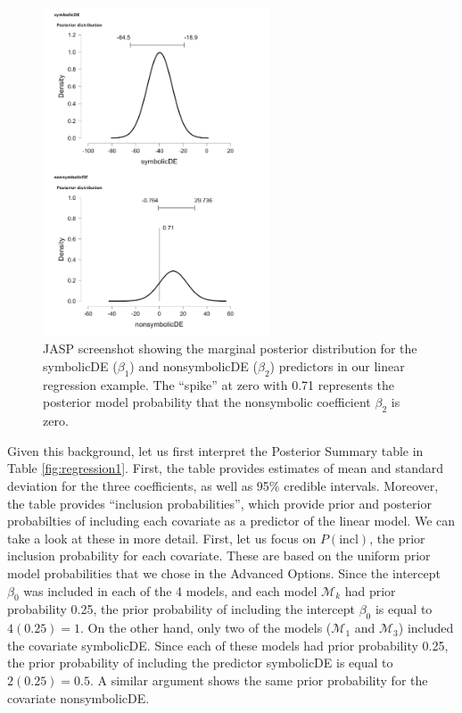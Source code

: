 \documentclass[english,,doc,floatsintext]{apa6}
\begin{document}
\begin{figure}
\centering
\includegraphics[width=0.6\textwidth,height=\textheight]{figures/marginalPosterior.png}
\caption{\label{fig:marginalPosterior}JASP screenshot showing the marginal posterior distribution for the symbolicDE (\(\beta_1\)) and nonsymbolicDE (\(\beta_2\)) predictors in our linear regression example. The \enquote{spike} at zero with 0.71 represents the posterior model probability that the nonsymbolic coefficient \(\beta_2\) is zero.}
\end{figure}

Given this background, let us first interpret the Posterior Summary table in Table \ref{fig:regression1}. First, the table provides estimates of mean and standard deviation for the three coefficients, as well as 95\% credible intervals. Moreover, the table provides \enquote{inclusion probabilities}, which provide prior and posterior probabilties of including each covariate as a predictor of the linear model. We can take a look at these in more detail. First, let us focus on \(P(\text{incl})\), the prior inclusion probability for each covariate. These are based on the uniform prior model probabilities that we chose in the Advanced Options. Since the intercept \(\beta_{0}\) was included in each of the 4 models, and each model \(\mathcal{M}_{k}\) had prior probability 0.25, the prior probability of including the intercept \(\beta_{0}\) is equal to \(4(0.25) = 1\). On the other hand, only two of the models (\(\mathcal{M}_{1}\) and \(\mathcal{M}_{3}\)) included the covariate symbolicDE. Since each of these models had prior probability 0.25, the prior probability of including the predictor symbolicDE is equal to \(2(0.25) = 0.5\). A similar argument shows the same prior probability for the covariate nonsymbolicDE.
\end{document}
